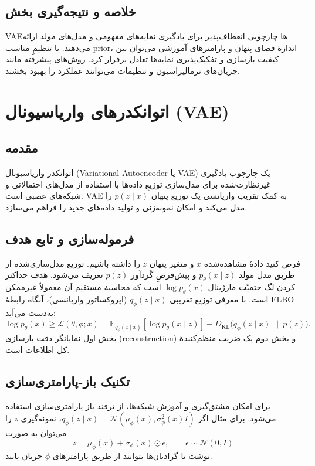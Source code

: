 \section{خلاصه و نتیجه‌گیری بخش}
VAEها چارچوبی انعطاف‌پذیر برای یادگیری نمایه‌های مفهومی و مدل‌های مولد ارائه می‌دهند. با تنظیمِ مناسب prior، اندازهٔ فضای پنهان و پارامترهای آموزشی می‌توان بین کیفیت بازسازی و تفکیک‌پذیری نمایه‌ها تعادل برقرار کرد. روش‌های پیشرفته مانند جریان‌های نرمالیزاسیون و تنظیمات \beta می‌توانند عملکرد را بهبود بخشند.
\renewcommand{\chaptername}{بخش}
\chapter{اتوانکدرهای واریاسیونال (VAE)}

\section{مقدمه}
اتوانکدر واریاسیونال (Variational Autoencoder یا VAE) یک چارچوب یادگیری غیرنظارت‌شده برای مدل‌سازی توزیعِ داده‌ها با استفاده از مدل‌های احتمالاتی و شبکه‌های عصبی است. VAE به کمک تقریب واریانسی یک توزیع پنهان $p(z\mid x)$ را مدل می‌کند و امکان نمونه‌زنی و تولید داده‌های جدید را فراهم می‌سازد.

\section{فرموله‌سازی و تابع هدف}
فرض کنید دادهٔ مشاهده‌شده $x$ و متغیر پنهان $z$ را داشته باشیم. توزیع مدل‌سازی‌شده از طریق مدل مولد $p_\theta(x\mid z)$ و پیش‌فرضِ گَردآور $p(z)$ تعریف می‌شود. هدف حداکثر کردن لگ-حتمیّت مارژینال $\log p_\theta(x)$ است که محاسبهٔ مستقیم آن معمولاً غیرممکن است. با معرفی توزیع تقریبی $q_\phi(z\mid x)$ (اپروکساتور واریانسی)، آنگاه رابطهٔ ELBO به‌دست می‌آید:
$$
\log p_\theta(x) \geq \mathcal{L}(\theta,\phi;x) = \mathbb{E}_{q_\phi(z\mid x)}[\log p_\theta(x\mid z)] - D_{\mathrm{KL}}\big(q_\phi(z\mid x)\ \|\ p(z)\big).
$$
بخش اول نمایانگر دقت بازسازی (reconstruction) و بخش دوم یک ضریب منظم‌کنندهٔ کل-اطلاعات است.

\section{تکنیک باز-پارامتری‌سازی}
برای امکان مشتق‌گیری و آموزش شبکه‌ها، از ترفند باز-پارامتری‌سازی استفاده می‌شود. برای مثال اگر $q_\phi(z\mid x)=\mathcal{N}(\mu_\phi(x),\sigma^2_\phi(x)I)$، نمونه‌گیری $z$ را می‌توان به صورت
$$
z = \mu_\phi(x) + \sigma_\phi(x) \odot \epsilon,\qquad \epsilon\sim\mathcal{N}(0,I)
$$
نوشت تا گرادیان‌ها بتوانند از طریق پارامترهای $\phi$ جریان یابند.

